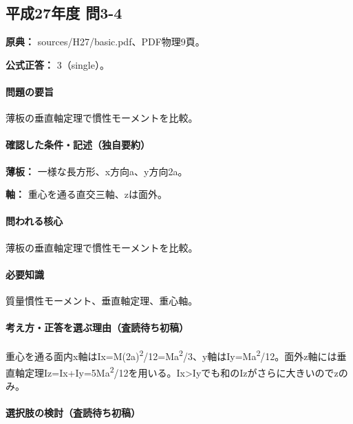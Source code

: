 \subsection{平成27年度 問3-4}
\label{q:h27-reg-basic-3-4}

\noindent\textbf{原典：} sources/H27/basic.pdf、PDF物理9頁。

\textbf{公式正答：} 3（single）。

\paragraph{問題の要旨} 薄板の垂直軸定理で慣性モーメントを比較。

\paragraph{確認した条件・記述（独自要約）}\mbox{}\par

\noindent\textbf{薄板：} 一様な長方形、x方向a、y方向2a。\par

\noindent\textbf{軸：} 重心を通る直交三軸、zは面外。\par

\paragraph{問われる核心} 薄板の垂直軸定理で慣性モーメントを比較。

\paragraph{必要知識} 質量慣性モーメント、垂直軸定理、重心軸。

\paragraph{考え方・正答を選ぶ理由（査読待ち初稿）} 重心を通る面内x軸はIx=\allowbreak{}M(2a)\textsuperscript{2}/12=\allowbreak{}Ma\textsuperscript{2}/3、y軸はIy=\allowbreak{}Ma\textsuperscript{2}/12。面外z軸には垂直軸定理Iz=\allowbreak{}Ix+Iy=\allowbreak{}5Ma\textsuperscript{2}/12を用いる。Ix>Iyでも和のIzがさらに大きいのでzのみ。

\paragraph{選択肢の検討（査読待ち初稿）}\mbox{}\par

